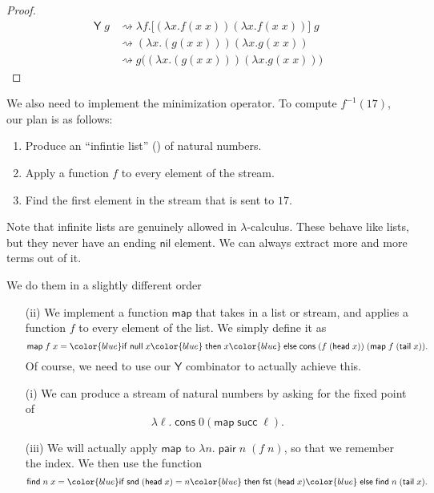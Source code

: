 \documentclass[a4paper]{article}
\newcommand\head{\mathsf{head}}
\newcommand\tail{\mathsf{tail}}
\newcommand\pair{\mathsf{pair}}
\renewcommand\succ{\mathsf{succ}}
\newcommand\cif{{\color{blue} \mathsf{if}\;}}
\newcommand\cthen{{\color{blue}\;\mathsf{then}\;}}
\newcommand\celse{{\color{blue}\;\mathsf{else}\;}}
\newcommand\cons{\mathsf{cons}}
\newcommand\cfst{\mathsf{fst}}
\newcommand\csnd{\mathsf{snd}}
\newcommand\cnil{\mathsf{nil}}
\newcommand\cmap{\mathsf{map}}
\newcommand\cnull{\mathsf{null}}
\newcommand\Yc{\mathsf{Y}}
\newcommand\cfind{\mathsf{find}}
\begin{document}
\begin{proof}
  \begin{align*}
    \Yc\; g &\rightsquigarrow \lambda f. \Big[ (\lambda x. f(x\; x)) (\lambda x. f(x\; x))\Big]\; g\\
    &\rightsquigarrow (\lambda x. (g(x\; x))) (\lambda x . g(x\; x))\\
    &\rightsquigarrow g\Big((\lambda x. (g(x\; x))) (\lambda x . g(x\; x))\Big)
  \end{align*}
\end{proof}
We also need to implement the minimization operator. To compute $f^{-1}(17)$, our plan is as follows:
\begin{enumerate}
  \item Produce an ``infintie list'' () of natural numbers.
  \item Apply a function $f$ to every element of the stream.
  \item Find the first element in the stream that is sent to $17$.
\end{enumerate}
Note that infinite lists are genuinely allowed in $\lambda$-calculus. These behave like lists, but they never have an ending $\cnil$ element. We can always extract more and more terms out of it.

We do them in a slightly different order
\begin{enumerate}
  \item[(ii)] We implement a function $\cmap$ that takes in a list or stream, and applies a function $f$ to every element of the list. We simply define it as
    \[
      \cmap\; f\; x = \cif \cnull\; x \cthen x \celse \cons\; (f\; (\head\; x))\;(\cmap\;f\; (\tail\; x)).
    \]
    Of course, we need to use our $\Yc$ combinator to actually achieve this.
  \item[(i)] We can produce a stream of natural numbers by asking for the fixed point of
    \[
      \lambda \ell.\; \cons \; 0 (\cmap\;\succ\;\ell).
    \]
  \item [(iii)] We will actually apply $\cmap$ to $\lambda n.\; \pair\; n\; (f\; n)$, so that we remember the index. We then use the function
    \[
      \cfind\; n\; x = \cif \csnd\;(\head\;x) = n \cthen \cfst\;(\head\;x) \celse \cfind\; n\; (\tail\;x).
    \]
\end{enumerate}
\end{document}
